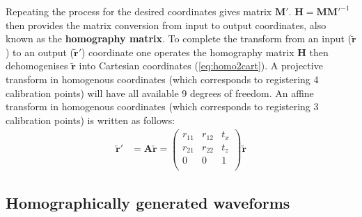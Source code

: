 Repeating the process for the desired coordinates gives matrix $\textbf{M}'$.
$\textbf{H} = \textbf{M} {\textbf{M}'}^{-1}$ then provides the matrix conversion from input to output coordinates, also known as the \textbf{homography matrix}.
To complete the transform from an input ($\widetilde{\textbf{r}}$) to an output ($\widetilde{\textbf{r}}'$) coordinate one operates the homography matrix $\textbf{H}$ %
then dehomogenises $\widetilde{\textbf{r}}$ into Cartesian coordinates (\eqref{eq:homo2cart}).
A projective transform in homogenous coordinates (which corresponds to registering 4 calibration points) will have all available 9 degrees of freedom.
An affine transform in homogenous coordinates (which corresponds to registering 3 calibration points) is written as follows:
\begin{align}
\widetilde{\textbf{r}}' &= \textbf{A} \widetilde{\textbf{r}}
= \begin{pmatrix}
r_{11} & r_{12} & t_x \\
r_{21} & r_{22} & t_z \\
0 & 0 & 1\\
\end{pmatrix}\widetilde{\textbf{r}}
\end{align}


\subsection{Homographically generated waveforms}

